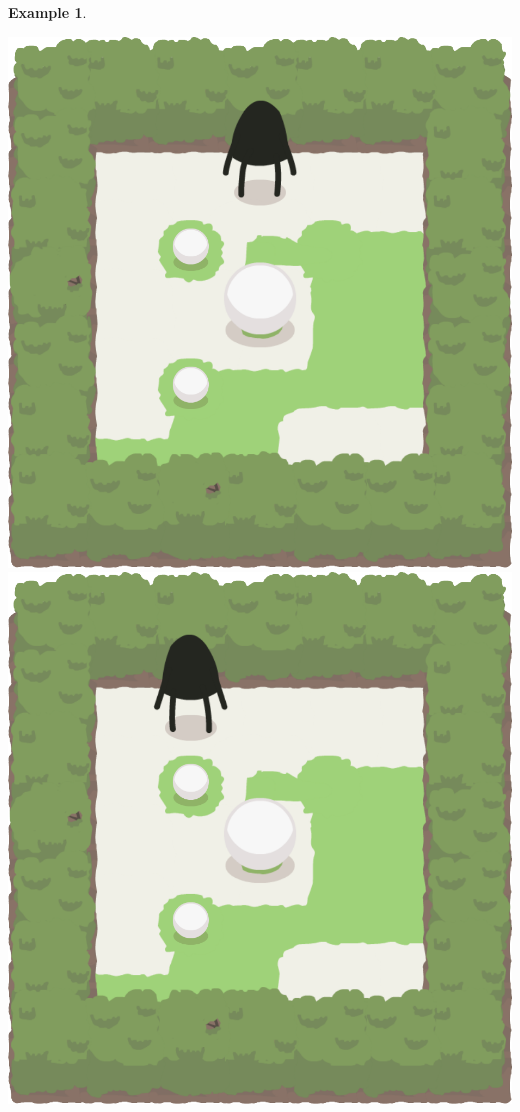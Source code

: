 \documentclass{report}
\theoremstyle{plain}
\newtheorem{example}{Example}[section]
\begin{document}
\begin{example}
\begin{center}
\includegraphics[width=\andyWidth\textwidth]{andy-basic-9.png} \quad
\includegraphics[width=\andyWidth\textwidth]{andy-basic-10.png} \quad

\end{center}
\end{example}
\end{document}
